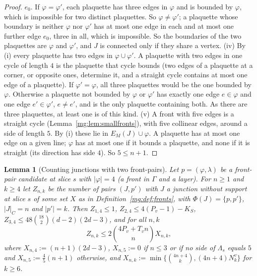 \documentclass[11pt,a4paper]{article}
\newtheorem{lemma}[theorem]{Lemma}
\theoremstyle{definition}
\theoremstyle{remark}
\begin{document}
\begin{proof}
$e_0$. If $\varphi=\varphi'$, each plaquette has three edges in $\varphi$ and is bounded by $\varphi$, which is impossible for two distinct plaquettes. So
$\varphi\ne\varphi'$; a plaquette whose boundary is neither $\varphi$ nor $\varphi'$ has at most one edge in each and at most one further edge $e_0$, three in all,
which is impossible. So the boundaries of the two plaquettes are $\varphi$ and $\varphi'$, and $J$ is connected only if they share a vertex.
(iv) By (i) every plaquette has two edges in $\varphi\cup\varphi'$. A plaquette with two edges in one cycle of length $4$ is the plaquette that cycle bounds
(two edges of a plaquette at a corner, or opposite ones, determine it, and a straight cycle contains at most one edge of a plaquette). If
$\varphi'=\varphi$, all three plaquettes would be the one bounded by $\varphi$. Otherwise a plaquette not bounded by $\varphi$ or $\varphi'$ has exactly one edge
$e\in\varphi$ and one edge $e'\in\varphi'$, $e\ne e'$, and is the only plaquette containing both. As there are three plaquettes, at least one is of this kind.
(v) A front with five edges is a straight cycle (Lemma~\ref{mg:lem:smallfronts}), with five collinear edges, around a side of length $5$. By (i) these lie
in $E_M(J)\cup\varphi$. A plaquette has at most one edge on a given line; $\varphi$ has at most one if it bounds a plaquette, and none if it is straight (its
direction has side $4$). So $5\le n+1$.
\end{proof}

\begin{lemma}[Counting junctions with two front-pairs]\label{mg:lem:twofrontcount}
Let $p=(\varphi,\lambda)$ be a front-pair candidate at slice $s$ with $|\varphi|=4$ (a front in $\Gamma$ and a layer). For $n\ge1$ and $k\ge4$ let $Z_{n,k}$
be the number of pairs $(J,p')$ with $J$ a junction without support at slice $s$ of some set $X$ as in Definition~\ref{mg:def:fronts}, with
$\Phi(J)=\{p,p'\}$, $|J|_C=n$ and $|p'|=k$.
Then $Z_{1,4}\le1$, $Z_{2,4}\le4(P_v-1)-K_S$, $Z_{3,4}\le48\binom{18}2(d-2)(2d-3)$, and for all $n,k$
\[
Z_{n,k}\le2\binom{4P_v+T_vn}{n}X_{n,k},
\]
where $X_{n,4}:=(n+1)(2d-3)$, $X_{n,5}:=0$ if $n\le3$ or if no side of $\Lambda_s$ equals $5$ and $X_{n,5}:=\frac45(n+1)$ otherwise, and $X_{n,k}:=\min\{\binom{4n+4}{k},(4n+4)N^v_k\}$ for $k\ge6$.
\end{lemma}
\end{document}
